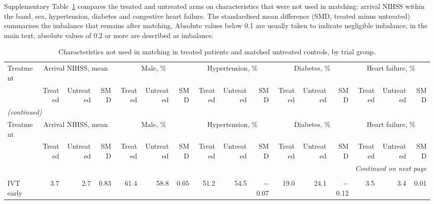 \begin{landscape}
\footnotesize
\setlength{\tabcolsep}{4pt}

{\normalsize
Supplementary Table~\ref{tab:supp_baseline_unmatched} compares the treated and untreated arms on characteristics that were not used in matching: arrival NIHSS within the band, sex, hypertension, diabetes and congestive heart failure. The standardised mean difference (SMD, treated minus untreated) summarises the imbalance that remains after matching. Absolute values below 0.1 are usually taken to indicate negligible imbalance; in the main text, absolute values of 0.2 or more are described as imbalance.
\par}
\bigskip

\begin{longtable}{p{5.6cm}rrrrrrrrrrrrrrr}
\caption{Characteristics not used in matching in treated patients and matched untreated controls, by trial group.}\label{tab:supp_baseline_unmatched}\\
\toprule
Treatment & \multicolumn{3}{c}{Arrival NIHSS, mean} & \multicolumn{3}{c}{Male, \%} & \multicolumn{3}{c}{Hypertension, \%} & \multicolumn{3}{c}{Diabetes, \%} & \multicolumn{3}{c}{Heart failure, \%} \\
\cmidrule(lr){2-4}\cmidrule(lr){5-7}\cmidrule(lr){8-10}\cmidrule(lr){11-13}\cmidrule(lr){14-16}
 & Treated & Untreated & SMD & Treated & Untreated & SMD & Treated & Untreated & SMD & Treated & Untreated & SMD & Treated & Untreated & SMD \\
\midrule
\endfirsthead
\multicolumn{16}{l}{\textit{(continued)}}\\
\toprule
Treatment & \multicolumn{3}{c}{Arrival NIHSS, mean} & \multicolumn{3}{c}{Male, \%} & \multicolumn{3}{c}{Hypertension, \%} & \multicolumn{3}{c}{Diabetes, \%} & \multicolumn{3}{c}{Heart failure, \%} \\
\cmidrule(lr){2-4}\cmidrule(lr){5-7}\cmidrule(lr){8-10}\cmidrule(lr){11-13}\cmidrule(lr){14-16}
 & Treated & Untreated & SMD & Treated & Untreated & SMD & Treated & Untreated & SMD & Treated & Untreated & SMD & Treated & Untreated & SMD \\
\midrule
\endhead
\midrule
\multicolumn{16}{r}{\textit{Continued on next page}}\\
\endfoot
\bottomrule
\endlastfoot
\multicolumn{16}{l}{\textbf{NIHSS 1--5}}\\
IVT early & 3.7 & 2.7 & 0.83 & 61.4 & 58.8 & 0.05 & 51.2 & 54.5 & $-$0.07 & 19.0 & 24.1 & $-$0.12 & 3.5 & 3.4 & 0.01 \\

\end{longtable}
\end{landscape}
